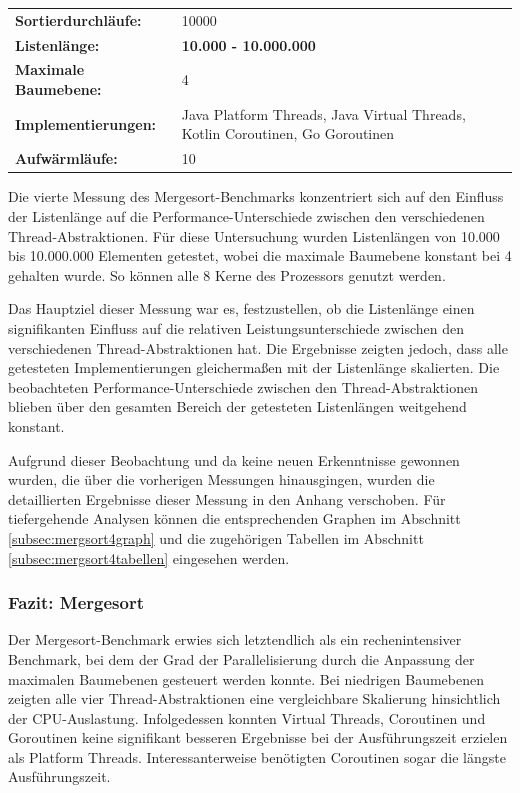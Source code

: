 \documentclass[fontsize=12pt,paper=a4,twoside=semi,parskip=half-,headsepline,headinclude]{scrreprt}
\begin{document}
\begin{tabularx}{\textwidth}{@{}lX@{}}
	\textbf{Sortierdurchläufe:} & 10000 \\
	\textbf{Listenlänge:} & \textbf{10.000 - 10.000.000} \\
	\textbf{Maximale Baumebene:} & 4 \\
	\textbf{Implementierungen:} & Java Platform Threads, Java Virtual Threads, Kotlin Coroutinen, Go Goroutinen \\
	\textbf{Aufwärmläufe:} & 10
\end{tabularx}

Die vierte Messung des Mergesort-Benchmarks konzentriert sich auf den Einfluss der Listenlänge auf die Performance-Unterschiede zwischen den verschiedenen Thread-Abs\-trak\-ti\-onen. Für diese Untersuchung wurden Listenlängen von 10.000 bis 10.000.000 Elementen getestet, wobei die maximale Baumebene konstant bei 4 gehalten wurde. So können alle 8 Kerne des Prozessors genutzt werden.

Das Hauptziel dieser Messung war es, festzustellen, ob die Listenlänge einen signifikanten Einfluss auf die relativen Leistungsunterschiede zwischen den verschiedenen Thread-Abstraktionen hat. Die Ergebnisse zeigten jedoch, dass alle getesteten Implementierungen gleichermaßen mit der Listenlänge skalierten. Die beobachteten Performance-Unterschiede zwischen den Thread-Abstraktionen blieben über den gesamten Bereich der getesteten Listenlängen weitgehend konstant.

Aufgrund dieser Beobachtung und da keine neuen Erkenntnisse gewonnen wurden, die über die vorherigen Messungen hinausgingen, wurden die detaillierten Ergebnisse dieser Messung in den Anhang verschoben. Für tiefergehende Analysen können die entsprechenden Graphen im Abschnitt \ref{subsec:mergsort4graph} und die zugehörigen Tabellen im Abschnitt \ref{subsec:mergsort4tabellen} eingesehen werden.

\subsubsection{Fazit: Mergesort}

Der Mergesort-Benchmark erwies sich letztendlich als ein rechenintensiver Benchmark, bei dem der Grad der Parallelisierung durch die Anpassung der maximalen Baumebenen gesteuert werden konnte. Bei niedrigen Baumebenen zeigten alle vier Thread-Abstraktionen eine vergleichbare Skalierung hinsichtlich der CPU-Auslastung. Infolgedessen konnten Virtual Threads, Coroutinen und Goroutinen keine signifikant besseren Ergebnisse bei der Ausführungszeit erzielen als Platform Threads. Interessanterweise benötigten Coroutinen sogar die längste Ausführungszeit.
\end{document}
